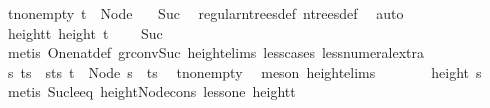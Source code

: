 \begin{isabellebody}
\ t{\isacharunderscore}{\kern0pt}non{\isacharunderscore}{\kern0pt}empty{\isacharcolon}{\kern0pt}\ {\isachardoublequoteopen}t\ {\isasymnoteq}\ Node\ {\isacharbrackleft}{\kern0pt}{\isacharbrackright}{\kern0pt}{\isachardoublequoteclose}\ \isamarkupfalse%
\ Suc{\isacharparenleft}{\kern0pt}{}{\isacharparenright}{\kern0pt}\ \isamarkupfalse%
\ regular{\isacharunderscore}{\kern0pt}n{\isacharunderscore}{\kern0pt}trees{\isacharunderscore}{\kern0pt}def\ n{\isacharunderscore}{\kern0pt}trees{\isacharunderscore}{\kern0pt}def\ \isamarkupfalse%
\ auto\isanewline
\ \ \ \ \isamarkupfalse%
\ \isamarkupfalse%
\ height{\isacharunderscore}{\kern0pt}t{\isacharcolon}{\kern0pt}\ {\isachardoublequoteopen}height\ t\ {\isacharequal}{\kern0pt}\ {}{\isachardoublequoteclose}\ \isamarkupfalse%
\ Suc{\isacharparenleft}{\kern0pt}{}{\isacharparenright}{\kern0pt}\isanewline
\ \ \ \ \ \ \isamarkupfalse%
\ {\isacharparenleft}{\kern0pt}metis\ One{\isacharunderscore}{\kern0pt}nat{\isacharunderscore}{\kern0pt}def\ gr{}{\isacharunderscore}{\kern0pt}conv{\isacharunderscore}{\kern0pt}Suc\ height{\isachardot}{\kern0pt}elims\ less{\isacharunderscore}{\kern0pt}{}{\isacharunderscore}{\kern0pt}cases\ less{\isacharunderscore}{\kern0pt}numeral{\isacharunderscore}{\kern0pt}extra{\isacharparenleft}{\kern0pt}{}{\isacharparenright}{\kern0pt}{\isacharparenright}{\kern0pt}\isanewline
\ \ \ \ \isamarkupfalse%
\ s\ ts\ \ s{\isacharunderscore}{\kern0pt}ts{\isacharcolon}{\kern0pt}\ {\isachardoublequoteopen}t\ {\isacharequal}{\kern0pt}\ Node\ {\isacharparenleft}{\kern0pt}s\ {\isacharhash}{\kern0pt}\ ts{\isacharparenright}{\kern0pt}{\isachardoublequoteclose}\ \isamarkupfalse%
\ t{\isacharunderscore}{\kern0pt}non{\isacharunderscore}{\kern0pt}empty\ \isamarkupfalse%
\ {\isacharparenleft}{\kern0pt}meson\ height{\isachardot}{\kern0pt}elims{\isacharparenright}{\kern0pt}\isanewline
\ \ \ \ \isamarkupfalse%
\ \isamarkupfalse%
\ {\isachardoublequoteopen}height\ s\ {\isacharequal}{\kern0pt}\ {}{\isachardoublequoteclose}\ \isamarkupfalse%
\ {\isacharparenleft}{\kern0pt}metis\ Suc{\isacharunderscore}{\kern0pt}le{\isacharunderscore}{\kern0pt}eq\ height{\isacharunderscore}{\kern0pt}Node{\isacharunderscore}{\kern0pt}cons\ less{\isacharunderscore}{\kern0pt}one\ height{\isacharunderscore}{\kern0pt}t{\isacharparenright}{\kern0pt}\isanewline

\end{isabellebody}
